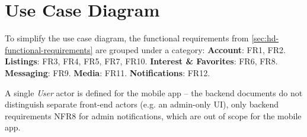 \section{Use Case Diagram}\label{sec:hd-use-case-diagram}
To simplify the use case diagram, the functional requirements from \cref{sec:hd-functional-requirements} are grouped under a category: \textbf{Account}: FR1, FR2. \textbf{Listings}: FR3, FR4, FR5, FR7, FR10. \textbf{Interest \& Favorites}: FR6, FR8. \textbf{Messaging}: FR9. \textbf{Media}: FR11. \textbf{Notifications}: FR12.

A single \textit{User} actor is defined for the mobile app -- the backend documents do not distinguish separate front-end actors (e.g. an admin-only UI), only backend requirements NFR8 for admin notifications, which are out of scope for the mobile app.

